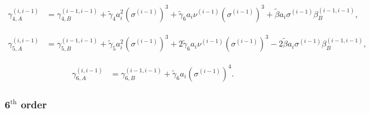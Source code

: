 \documentclass[12pt]{article}
\begin{document}
{\small
\begin{equation}
  \begin{aligned}
    \gamma_{4, A}^{(i, i-1)} &= \gamma_{4, B}^{(i-1, i-1)} + \tilde{\gamma}_{4} a_{i}^{2} \left( \sigma^{(i-1)} \right)^{3} + \tilde{\gamma}_{6} a_{i} \nu^{(i-1)} \left( \sigma^{(i-1)} \right)^{3} + \tilde{\beta} a_{i} \sigma^{(i-1)} \beta_{B}^{(i-1, i-1)},
  \end{aligned}
\end{equation}
}

{\small
\begin{equation}
  \begin{aligned}
    \gamma_{5, A}^{(i, i-1)} &= \gamma_{5, B}^{(i-1, i-1)} + \tilde{\gamma}_{5} a_{i}^{2} \left( \sigma^{(i-1)} \right)^{3} + 2 \tilde{\gamma}_{6} a_{i} \nu^{(i-1)} \left( \sigma^{(i-1)} \right)^{3} - 2 \tilde{\beta} a_{i} \sigma^{(i-1)} \beta_{B}^{(i-1, i-1)},
  \end{aligned}
\end{equation}
}

{\small
\begin{equation}
  \begin{aligned}
    \gamma_{6, A}^{(i, i-1)} &= \gamma_{6, B}^{(i-1, i-1)} + \tilde{\gamma}_{6} a_{i} \left( \sigma^{(i-1)} \right)^{4}.
  \end{aligned}
\end{equation}
}

\subsubsection*{$\mathbf{6}^{\textrm{th}}$ order}

\vspace{0.2cm}
\end{document}
